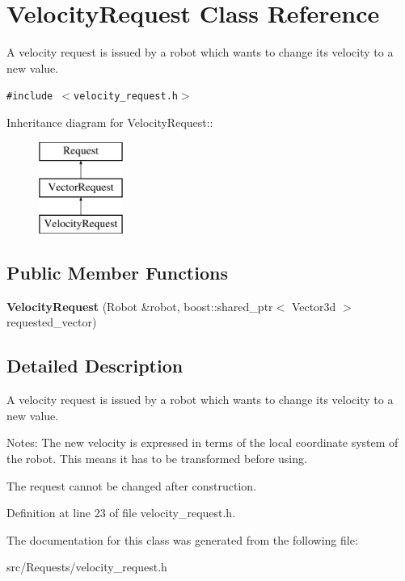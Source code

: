 \hypertarget{class_velocity_request}{
\section{VelocityRequest Class Reference}
\label{class_velocity_request}
}
A velocity request is issued by a robot which wants to change its velocity to a new value.  


{\tt \#include $<$velocity\_\-request.h$>$}

Inheritance diagram for VelocityRequest::\begin{figure}[H]
\begin{center}
\leavevmode
\includegraphics[height=3cm]{class_velocity_request}
\end{center}
\end{figure}
\subsection*{Public Member Functions}
\begin{CompactItemize}
\item 
\hypertarget{class_velocity_request_4d67e0268ad27325e7e06ff5cb9b7d71}{
\textbf{VelocityRequest} (Robot \&robot, boost::shared\_\-ptr$<$ Vector3d $>$ requested\_\-vector)}
\label{class_velocity_request_4d67e0268ad27325e7e06ff5cb9b7d71}

\end{CompactItemize}


\subsection{Detailed Description}
A velocity request is issued by a robot which wants to change its velocity to a new value. 

Notes: The new velocity is expressed in terms of the local coordinate system of the robot. This means it has to be transformed before using.

The request cannot be changed after construction. 

Definition at line 23 of file velocity\_\-request.h.

The documentation for this class was generated from the following file:\begin{CompactItemize}
\item 
src/Requests/velocity\_\-request.h\end{CompactItemize}
